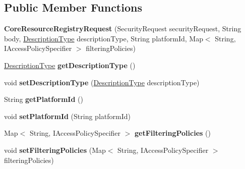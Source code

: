 \subsection*{Public Member Functions}
\begin{DoxyCompactItemize}
\item 
\mbox{\label{classeu_1_1h2020_1_1symbiote_1_1core_1_1internal_1_1CoreResourceRegistryRequest_ae608e12e14f3ffac5f6912db7fc39fe2}} 
{\bfseries Core\+Resource\+Registry\+Request} (Security\+Request security\+Request, String body, \hyperlink{enumeu_1_1h2020_1_1symbiote_1_1core_1_1internal_1_1DescriptionType}{Description\+Type} description\+Type, String platform\+Id, Map$<$ String, I\+Access\+Policy\+Specifier $>$ filtering\+Policies)
\item 
\mbox{\label{classeu_1_1h2020_1_1symbiote_1_1core_1_1internal_1_1CoreResourceRegistryRequest_a35cf3d6f50b04cc9ae16702007bcf429}} 
\hyperlink{enumeu_1_1h2020_1_1symbiote_1_1core_1_1internal_1_1DescriptionType}{Description\+Type} {\bfseries get\+Description\+Type} ()
\item 
\mbox{\label{classeu_1_1h2020_1_1symbiote_1_1core_1_1internal_1_1CoreResourceRegistryRequest_aa4cacc40189f5c20cd04ab67c971463a}} 
void {\bfseries set\+Description\+Type} (\hyperlink{enumeu_1_1h2020_1_1symbiote_1_1core_1_1internal_1_1DescriptionType}{Description\+Type} description\+Type)
\item 
\mbox{\label{classeu_1_1h2020_1_1symbiote_1_1core_1_1internal_1_1CoreResourceRegistryRequest_a9b8070cd63489b5c3acf4e5e0299b7c3}} 
String {\bfseries get\+Platform\+Id} ()
\item 
\mbox{\label{classeu_1_1h2020_1_1symbiote_1_1core_1_1internal_1_1CoreResourceRegistryRequest_a52472d0b7624365c0ae14b897df500dc}} 
void {\bfseries set\+Platform\+Id} (String platform\+Id)
\item 
\mbox{\label{classeu_1_1h2020_1_1symbiote_1_1core_1_1internal_1_1CoreResourceRegistryRequest_afe0be45c5fd2ea7b8afa6fa857bb9fb0}} 
Map$<$ String, I\+Access\+Policy\+Specifier $>$ {\bfseries get\+Filtering\+Policies} ()
\item 
\mbox{\label{classeu_1_1h2020_1_1symbiote_1_1core_1_1internal_1_1CoreResourceRegistryRequest_a527fcc5bd393c67053c218d24f06aaea}} 
void {\bfseries set\+Filtering\+Policies} (Map$<$ String, I\+Access\+Policy\+Specifier $>$ filtering\+Policies)
\end{DoxyCompactItemize}


